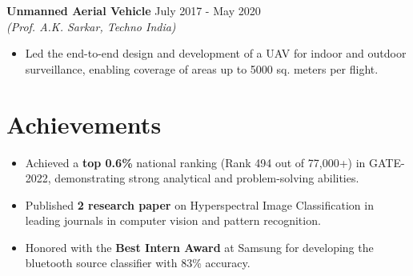 \documentclass[a4paper,10pt]{article}
\begin{document}
\vspace{0.05 cm}
\textbf{Unmanned Aerial Vehicle} \hfill July 2017 - May 2020 \\
\textit{(Prof. A.K. Sarkar, Techno India)}
\begin{itemize}[noitemsep,topsep=0pt]
    \item Led the end-to-end design and development of a UAV for indoor and outdoor surveillance, enabling coverage of areas up to 5000 sq. meters per flight.
\end{itemize}

\vspace{-1em}
\section*{Achievements}
\begin{itemize}[noitemsep,topsep=0pt]
    \item Achieved a \textbf{top 0.6\%} national ranking (Rank 494 out of 77,000+) in GATE-2022, demonstrating strong analytical and problem-solving abilities.
    \item Published \textbf{2 research paper} on Hyperspectral Image Classification in leading journals in computer vision and pattern recognition.
    \item Honored with the \textbf{Best Intern Award} at Samsung for developing the bluetooth source classifier with 83\% accuracy.
\end{itemize}
\end{document}
